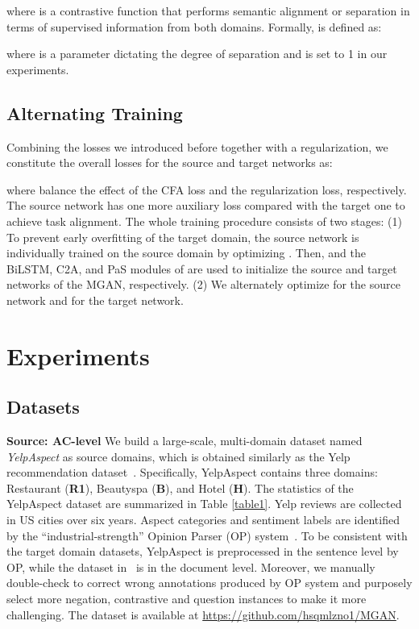 \documentclass[letterpaper]{article} \usepackage{aaai19}  \usepackage{times}  \usepackage{latexsym}
\begin{document}
where  is a contrastive function that performs semantic alignment or separation in terms of supervised information from both domains. Formally,  is defined as:

where  is a parameter dictating the degree of separation and is set to 1 in our experiments. 

\subsection{Alternating Training}
Combining the losses we introduced before together with a  regularization, we constitute the overall losses for the source and target networks as:

\noindent
where  balance the effect of the CFA loss and the  regularization loss, respectively. The source network has one more auxiliary loss  compared with the target one to achieve task alignment. The whole training procedure consists of two stages: (1) To prevent early overfitting of the target domain, the source network  is individually trained on the source domain by optimizing . Then,  and the BiLSTM, C2A, and PaS modules of  are used to initialize the source and target networks of  the MGAN, respectively. (2) We alternately optimize  for the source network and  for the target network.


\section{Experiments}

\subsection{Datasets}
\noindent \textbf{Source: AC-level}
We build a large-scale, multi-domain dataset named \emph{{YelpAspect}} as source domains, which is obtained similarly as the Yelp recommendation dataset~\cite{bauman2017aspect}. Specifically, YelpAspect contains three domains: Restaurant (\textbf{R1}), Beautyspa (\textbf{B}), and Hotel (\textbf{H}). The statistics of the YelpAspect dataset are summarized in Table \ref{table1}. Yelp reviews are collected in US cities over six years. Aspect categories and sentiment labels are identified by the ``industrial-strength'' Opinion Parser (OP) system~\cite{qiu2011opinion,liu2015sent}. To be consistent with the target domain datasets, YelpAspect is preprocessed in the sentence level by OP, while the dataset in~\cite{bauman2017aspect} is in the document level. Moreover, we manually double-check to correct wrong annotations produced by OP system and purposely select more negation, contrastive and question instances to make it more challenging. The dataset is available at \url{https://github.com/hsqmlzno1/MGAN}.
\end{document}
